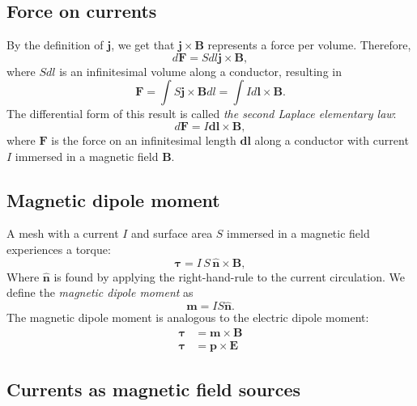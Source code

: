 \documentclass[a4paper, 12pt]{article}
\renewcommand{\vec}[1]{\mathbf{#1}}
\newcommand{\E}{\ensuremath{\vec{E}}}
\renewcommand{\j}{\ensuremath{\vec{j}}}
\newcommand{\B}{\ensuremath{\vec{B}}}
\let\tmp\hat
\renewcommand{\hat}[1]{\vec{\tmp{#1}}}
\begin{document}
    \subsection{Force on currents}
        By the definition of \j, we get that $\j \times \B$ represents a force per volume. Therefore, 
        \begin{equation}
            d\vec{F} = S dl \j \times \B, 
        \end{equation}
        where $S dl$ is an infinitesimal volume along a conductor, resulting in 
        \begin{equation}
            \vec{F} = \int S \j \times \B dl = \int I d\vec{l} \times \B.
        \end{equation}
        The differential form of this result is called \textit{the second Laplace elementary law}:
        \begin{equation}
            d\vec{F} = I\vec{dl} \times \B,
        \end{equation}
        where $\vec{F}$ is the force on an infinitesimal length $\vec{dl}$ along a conductor with current $I$ 
        immersed in a magnetic field $\B$.
        
    \subsection{Magnetic dipole moment}
    
        A mesh with a current $I$ and surface area $S$ immersed in a magnetic field experiences a torque:
        \begin{equation}
            \vec{\tau} = I\,S\,\hat{n}\times\B,
        \end{equation}
        Where $\hat{n}$ is found by applying the right-hand-rule to the current circulation. 
        We define the \textit{magnetic dipole moment} as
        \begin{equation}
            \vec{m} = IS\hat{n}.
        \end{equation}
        The magnetic dipole moment is analogous to the electric dipole moment: 
        \begin{align*}
            \vec{\tau} &= \vec{m} \times \B\\
            \vec{\tau} &= \vec{p} \times \E
        \end{align*}
    
    \subsection{Currents as magnetic field sources}
    
\end{document}
